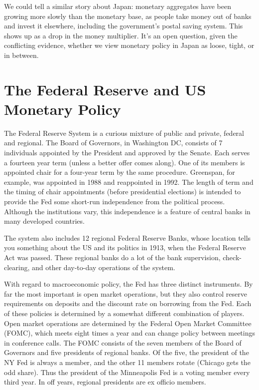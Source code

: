 \documentclass[letterpaper,12pt]{article}
\begin{document}
     We could tell a similar story about Japan:  monetary aggregates have
been growing more slowly than the monetary base, as people take money out of banks and invest it
elsewhere, including the government's postal saving system.  This shows up as a drop in the money
multiplier.  It's an open question, given the conflicting evidence, whether we view monetary
policy in Japan as loose, tight, or in between.


\section{The Federal Reserve and US Monetary Policy}

     The Federal Reserve System is a curious mixture of public and private,
federal and regional.  The Board of Governors, in Washington DC, consists of 7 individuals
appointed by the President and approved by the Senate.  Each serves a fourteen year term (unless a
better offer comes along).  One of its members is appointed chair for a four-year term by the same
procedure. Greenspan, for example, was appointed in 1988 and reappointed in 1992.  The length of
term and the timing of chair appointments (before presidential elections) is intended to provide
the Fed some short-run independence from the political process.  Although the institutions vary,
this independence is a feature of central banks in many developed countries.

     The system also includes 12 regional Federal Reserve Banks, whose
location tells you something about the US and its politics in 1913, when the Federal Reserve Act
was passed.  These regional banks do a lot of the bank supervision, check-clearing, and other
day-to-day operations of the system.

     With regard to macroeconomic policy, the Fed has three distinct
instruments.  By far the most important is open market operations, but they also control reserve
requirements on deposits and the discount rate on borrowing from the Fed.  Each of these policies
is determined by a somewhat different combination of players.  Open market operations are
determined by the Federal Open Market Committee (FOMC), which meets eight times a year and can
change policy between meetings in conference calls.  The FOMC consists of the seven members of the
Board of Governors and five presidents of regional banks.  Of the five, the president of the NY
Fed is always a member, and the other 11 members rotate (Chicago gets the odd share).  Thus the
president of the Minneapolis Fed is a voting member every third year.  In off years, regional
presidents are ex officio members.
\end{document}
